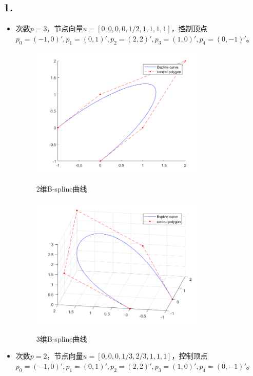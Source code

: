 \documentclass[utf8]{ctexart}
\begin{document}
\subsection*{1.}
\begin{itemize}
    \item 次数$p=3$，节点向量$u = [0, 0, 0, 0, 1/2, 1, 1, 1, 1]$，控制顶点
    $p_0=(-1,0)', p_1=(0,1)', p_2=(2,2)', p_3=(1,0)', p_4=(0,-1)'$。
    \begin{figure}[H]
        \centering
        \includegraphics[width=0.8\textwidth]{bspline_2d_1.png}
        \label{fig: bspline_2d_1}
        \caption{2维B-spline曲线}
    \end{figure}
    \begin{figure}[H]
        \centering
        \includegraphics[width=0.8\textwidth]{bspline_3d_1.png}
        \label{fig: bspline_3d_1}
        \caption{3维B-spline曲线}
    \end{figure}
    \item 次数$p=2$，节点向量$u = [0, 0, 0, 1/3, 2/3, 1, 1, 1]$，控制顶点
    $p_0=(-1,0)', p_1=(0,1)', p_2=(2,2)', p_3=(1,0)', p_4=(0,-1)'$。

\end{itemize}
\end{document}

